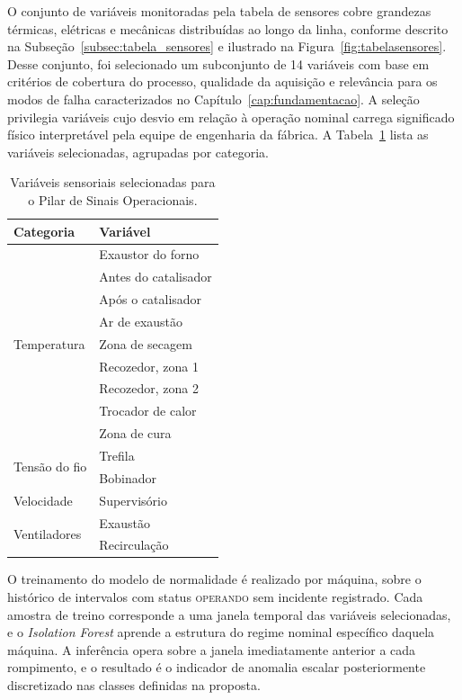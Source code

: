 O conjunto de variáveis monitoradas pela tabela de sensores cobre grandezas térmicas, elétricas e mecânicas distribuídas ao longo da linha, conforme descrito na Subseção~\ref{subsec:tabela_sensores} e ilustrado na Figura~\ref{fig:tabelasensores}. Desse conjunto, foi selecionado um subconjunto de 14 variáveis com base em critérios de cobertura do processo, qualidade da aquisição e relevância para os modos de falha caracterizados no Capítulo~\ref{cap:fundamentacao}. A seleção privilegia variáveis cujo desvio em relação à operação nominal carrega significado físico interpretável pela equipe de engenharia da fábrica. A Tabela~\ref{tab:sensores_pilar_sinais} lista as variáveis selecionadas, agrupadas por categoria.

\begin{table}[htbp]
    \centering
    \footnotesize
    \caption{Variáveis sensoriais selecionadas para o Pilar de Sinais Operacionais.}
    \label{tab:sensores_pilar_sinais}
    \begin{tabularx}{\textwidth}{lX}
        \toprule
        \textbf{Categoria} & \textbf{Variável} \\
        \midrule
        \multirow{9}{*}{Temperatura}
            & Exaustor do forno \\
            & Antes do catalisador \\
            & Após o catalisador \\
            & Ar de exaustão \\
            & Zona de secagem \\
            & Recozedor, zona 1 \\
            & Recozedor, zona 2 \\
            & Trocador de calor \\
            & Zona de cura \\
        \midrule
        \multirow{2}{*}{Tensão do fio}
            & Trefila \\
            & Bobinador \\
        \midrule
        Velocidade
            & Supervisório \\
        \midrule
        \multirow{2}{*}{Ventiladores}
            & Exaustão \\
            & Recirculação \\
        \bottomrule
    \end{tabularx}
\end{table}

O treinamento do modelo de normalidade é realizado por máquina, sobre o histórico de intervalos com status \textsc{operando} sem incidente registrado. Cada amostra de treino corresponde a uma janela temporal das variáveis selecionadas, e o \emph{Isolation Forest} aprende a estrutura do regime nominal específico daquela máquina. A inferência opera sobre a janela imediatamente anterior a cada rompimento, e o resultado é o indicador de anomalia escalar posteriormente discretizado nas classes definidas na proposta.


